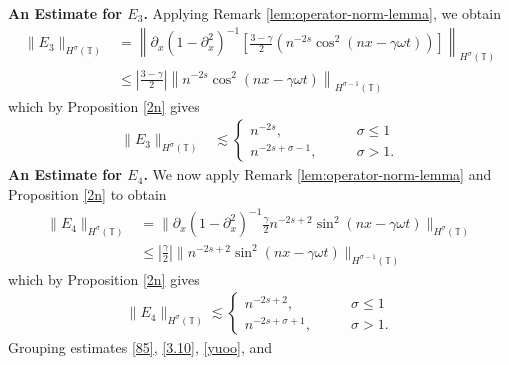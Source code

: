\documentclass[12pt,reqno]{amsart}
\newcommand{\p}{\partial}
\newcommand{\ci}{\mathbb{T}}
\theoremstyle{plain}  %
\theoremstyle{definition}
\begin{document}
{\bf An Estimate for $\hyperref[90]{E_3}$.}
Applying Remark \ref{lem:operator-norm-lemma}, we obtain
		\begin{equation}
		\begin{split}
			\|E_3\|_{H^\sigma(\ci)} & = \left \|\p_x(1-\p_x^2)^{-1}
			\left[ \frac{3-\gamma}{2}\left( n^{-2s}\cos^2\left( nx - \gamma 
			\omega
			t\right)\right) \right] \right \|_{H^\sigma(\ci)}
			\\
			& \le \left |\frac{3-\gamma}{2}\right |
			\left \| n^{-2s}\cos^2\left( nx - \gamma \omega t \right)
			\right \|_{H^{\sigma -1 }(\ci)}
			\end{split}
	\end{equation}
which by Proposition \ref{2n} gives
		\begin{equation}
			\label{yuoo}
		\begin{split}
			\|E_3\|_{H^\sigma(\ci)}
			& \lesssim 
			\begin{cases}
				n^{-2s}, \qquad & \sigma \le 1  \\
				n^{-2s +\sigma -1}, \qquad & \sigma
				> 1.
			\end{cases}
		\end{split}
	\end{equation}
	{\bf An Estimate for $\hyperref[90]{E_4}$.}
	We now apply Remark \ref{lem:operator-norm-lemma} and Proposition 
	\ref{2n} to obtain
	\begin{equation*}
		\begin{split}
			\|E_4\|_{H^\sigma(\ci)}
			& = \Big \|\p_x \left( 1 - \p_x^2 \right)^{-1} 
			\frac{\gamma}{2}n^{-2s+2}\sin^2\left(
			nx - \gamma \omega t \right) \Big \|_{H^\sigma(\ci)}
			\\
			& \leq \left | \frac{\gamma}{2} \right |  \| 
			n^{-2s+2}\sin^2\left( nx - \gamma \omega t
			\right)\|_{H^{\sigma -1}(\ci)}
			\end{split}
	\end{equation*}
	which by Proposition \ref{2n} gives
	\begin{equation}
			\label{estimate_for_second_piece_of_non_local_final}
		\begin{split}
			\|E_4\|_{H^\sigma(\ci)} \lesssim 
			\begin{cases}
				n^{-2s+2}, \qquad & \sigma \le 1
				\\
				n^{-2s+ \sigma + 1}, \qquad & \sigma >1.
			\end{cases}
		\end{split}
	\end{equation}
	Grouping estimates \eqref{85}, \eqref{3.10}, \eqref{yuoo}, and
\end{document}
